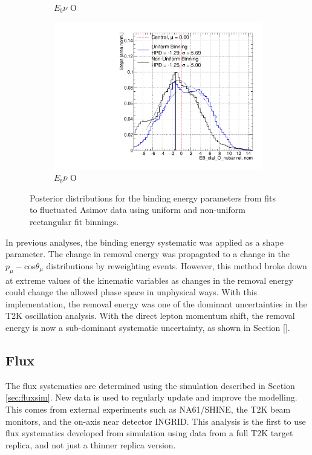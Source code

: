 \begin{figure}
\begin{subfigure}{.48\textwidth}
  \caption{$E_{b}\nu$ O}
\end{subfigure}
\begin{subfigure}{.48\textwidth}
  \centering
  \includegraphics[width=0.73\linewidth]{figs/EB_dial_O_nubarFluc2}
  \caption{$E_{b}\bar{\nu}$ O}
\end{subfigure}
\caption{Posterior distributions for the binding energy parameters from fits to fluctuated Asimov data using uniform and non-uniform rectangular fit binnings.}
\label{fig:Ebfluc}
\end{figure}

In previous analyses, the binding energy systematic was applied as a shape parameter. The change in removal energy was propagated to a change in the $p_{\mu}-$cos$\theta_{\mu}$ distributions by reweighting events. However, this method broke down at extreme values of the kinematic variables as changes in the removal energy could change the allowed phase space in unphysical ways. With this implementation, the removal energy was one of the dominant uncertainties in the T2K oscillation analysis. With the direct lepton momentum shift, the removal energy is now a sub-dominant systematic uncertainty, as shown in Section \ref{}.

\subsection{Flux}\label{sec:flux}

The flux systematics are determined using the simulation described in Section \ref{sec:fluxsim}. New data is used to regularly update and improve the modelling. This comes from external experiments such as NA61/SHINE\cite{na61}, the T2K beam monitors, and the on-axis near detector INGRID. This analysis is the first to use flux systematics developed from simulation using data from a full T2K target replica, and not just a thinner replica version.

